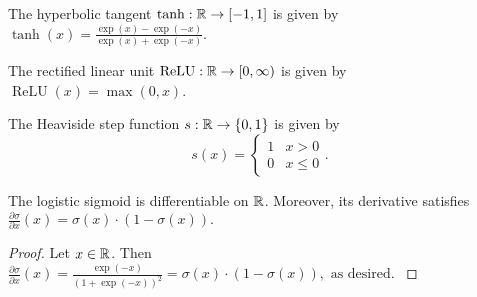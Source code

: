 \begin{definition}
The hyperbolic tangent $\tanh : {\mathbb R} \to [-1,1]$ is given by \newline $\tanh{(x)} = \frac{\exp{(x)} - \exp{(-x)}}{\exp{(x)} + \exp{(-x)}}$.
\end{definition}
\begin{definition}
The rectified linear unit $\operatorname{ReLU} : {\mathbb R} \to [0, \infty)$ is given by \newline $\operatorname{ReLU}(x) = \max{(0, x)}$.
\end{definition}
\begin{definition}
The Heaviside step function $s : {\mathbb R} \to \{0,1\}$ is given by
\[ 
    s(x) = \begin{cases} 
      1 & x > 0 \\
      0 & x \leq 0
   \end{cases}.
\]
\end{definition}
\begin{lemma}
\label{lemma:introduction:activation:sigmoid-derivative}
The logistic sigmoid is differentiable on ${\mathbb R}$. Moreover, its derivative satisfies $\frac{\partial \sigma}{\partial x} (x) = \sigma (x) \cdot (1 - \sigma(x)).$
\end{lemma}
\begin{proof}
Let $x \in {\mathbb R}$. Then $\frac{\partial \sigma}{\partial x} (x) = \frac{\exp{(-x)}}{(1 + \exp{(-x)})^2} = \sigma (x) \cdot (1 - \sigma (x)), \text{ as desired. }$
\end{proof}
